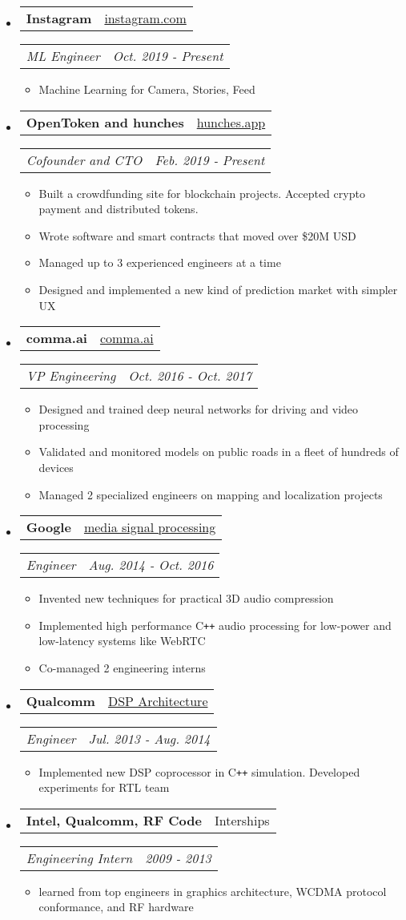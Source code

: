 \documentclass[hidelinks,letterpaper,10pt]{article}
\makeatletter
\newcommand{\resitem}[1]{\item #1 \vspace{-2pt}}
\newcommand{\resheading}[1]{{\large \parashade[.9]{sharpcorners}{\textbf{#1 \vphantom{p\^{E}}}}}
\vspace{-18pt}\noindent\makebox[\linewidth]{\rule{\textwidth}{1pt}}
}
\newcommand{\ressubheading}[4]{
\begin{tabular*}{6.5in}{l@{\extracolsep{\fill}}r}
        \textbf{#1} & #2
\end{tabular*}
\begin{tabular*}{6.5in}{l@{\extracolsep{\fill}}r}
        \textit{#3} & \textit{#4}
\end{tabular*}\vspace{-6pt}
}
\makeatother
\begin{document}
\resheading{Work}
\begin{itemize}
\item
  \ressubheading{Instagram}{\href{https://instagram.com}{instagram.com}}{ML Engineer}{Oct. 2019 - Present}
  \begin{itemize}
    \resitem{Machine Learning for Camera, Stories, Feed}
  \end{itemize}

\item
  \ressubheading{OpenToken and hunches}{\href{https://hunches.app}{hunches.app}}{Cofounder and CTO}{Feb. 2019 - Present}
  \begin{itemize}
    \resitem{Built a crowdfunding site for blockchain projects. Accepted crypto payment and distributed tokens.}
    \resitem{Wrote software and smart contracts that moved over \$20M USD}
    \resitem{Managed up to 3 experienced engineers at a time}
    \resitem{Designed and implemented a new kind of prediction market with simpler UX}
  \end{itemize}

\item
  \ressubheading{comma.ai}{\href{https://comma.ai}{comma.ai}}{VP Engineering}{Oct. 2016 - Oct. 2017}
  \begin{itemize}
    \resitem{Designed and trained deep neural networks for driving and video processing}
    \resitem{Validated and monitored models on public roads in a fleet of hundreds of devices}
    \resitem{Managed 2 specialized engineers on mapping and localization projects}
  \end{itemize}

\item
  \ressubheading{Google}{\href{https://google.com}{media signal processing}}{Engineer}{Aug. 2014 - Oct. 2016}
  \begin{itemize}
    \resitem{Invented new techniques for practical 3D audio compression}
    \resitem{Implemented high performance C\texttt{++} audio processing for low-power and low-latency systems like WebRTC}
    \resitem{Co-managed 2 engineering interns}
  \end{itemize}

\item
  \ressubheading{Qualcomm}{\href{en.wikipedia.org/wiki/Qualcomm_Hexagon}{DSP Architecture}}{Engineer}{Jul. 2013 - Aug. 2014}
  \begin{itemize}
    \resitem{Implemented new DSP coprocessor in C\texttt{++} simulation. Developed experiments for RTL team}
  \end{itemize}

\item
  \ressubheading{Intel, Qualcomm, RF Code}{Interships}{Engineering Intern}{2009 - 2013}
  \begin{itemize}
    \resitem{learned from top engineers in graphics architecture, WCDMA protocol conformance, and RF hardware}
  \end{itemize}

\end{itemize}
\end{document}
